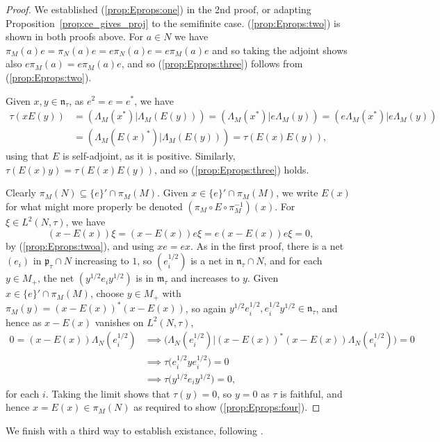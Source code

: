 \documentclass[a4paper,11pt]{article}
\newcommand{\mf}[1]{{\mathfrak{#1}}}
\theoremstyle{definition}
\begin{document}
\begin{proof}
We established (\ref{prop:Eprops:one}) in the 2nd proof, or adapting Proposition~\ref{prop:ce_gives_proj} to the semifinite case.  (\ref{prop:Eprops:two}) is shown in both proofs above.  For $a\in N$ we have $\pi_M(a) e = \pi_N(a) e = e \pi_N(a) e = e \pi_M(a) e$ and so taking the adjoint shows also $e \pi_M(a) = e \pi_M(a) e$, and so (\ref{prop:Eprops:three}) follows from (\ref{prop:Eprops:two}).

Given $x,y\in\mf n_\tau$, as $e^2=e=e^*$, we have
\begin{align*}
\tau(xE(y)) &= (\Lambda_M(x^*)|\Lambda_M(E(y)))
= (\Lambda_M(x^*)|e\Lambda_M(y))
= (e\Lambda_M(x^*)|e\Lambda_M(y)) \\
&= (\Lambda_M(E(x)^*)|\Lambda_M(E(y)))
= \tau(E(x)E(y)),
\end{align*}
using that $E$ is self-adjoint, as it is positive.  Similarly, $\tau(E(x)y) = \tau(E(x)E(y))$, and so (\ref{prop:Eprops:three}) holds.

Clearly $\pi_M(N) \subseteq \{e\}' \cap \pi_M(M)$.  Given $x\in \{e\}'\cap \pi_M(M)$, we write $E(x)$ for what might more properly be denoted $(\pi_M\circ E \circ \pi_M^{-1})(x)$.  For $\xi\in L^2(N,\tau)$, we have
\[ (x-E(x))\xi = (x-E(x))e\xi = e(x-E(x))e\xi = 0, \]
by (\ref{prop:Eprops:twoa}), and using $xe=ex$.
As in the first proof, there is a net $(e_i)$ in $\mf p_\tau\cap N$ increasing to $1$, so $(e_i^{1/2})$ is a net in $\mf n_\tau\cap N$, and for each $y\in M_+$, the net $(y^{1/2} e_i y^{1/2})$ is in $\mf m_\tau$ and increases to $y$.  Given $x\in \{e\}' \cap \pi_M(M)$, choose $y\in M_+$ with $\pi_M(y) = (x-E(x))^*(x-E(x))$, so again $y^{1/2} e_i^{1/2}, e_i^{1/2} y^{1/2} \in \mf n_\tau$, and hence as $x-E(x)$ vanishes on $L^2(N,\tau)$,
\begin{align*}
0 = (x-E(x))\Lambda_N(e_i^{1/2})
&\implies \big( \Lambda_N(e_i^{1/2}) \big| (x-E(x))^*(x-E(x))\Lambda_N(e_i^{1/2})) = 0 \\
&\implies \tau\big( e_i^{1/2} y e_i^{1/2} \big) = 0 \\
&\implies \tau\big( y^{1/2} e_i y^{1/2} \big) = 0,
\end{align*}
for each $i$.  Taking the limit shows that $\tau(y)=0$, so $y=0$ as $\tau$ is faithful, and hence $x = E(x) \in \pi_M(N)$ as required to show (\ref{prop:Eprops:four}).
\end{proof}

We finish with a third way to establish existance, following \cite[Chapter~V, Proposition~2.36]{TakesakiI}.
\end{document}

